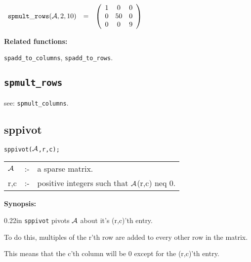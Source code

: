 \vspace*{0.1in}

\begin{flushleft}  
\hspace*{0.1in}
\begin{math}  
\begin{array}{ccc}
{\tt spmult\_rows}({\cal A},2,10) & = & 
        \left( \begin{array}{ccc} 1 & 0 & 0 \\ 0 & 50 & 0 \\ 0 & 0 & 
9 \end{array} \right) 
\end{array}
\end{math}  
\end{flushleft}

{\bf Related functions:}

\hspace*{0.175in} {\tt spadd\_to\_columns}, {\tt spadd\_to\_rows}.


\subsection{\tt spmult\_rows}

\hspace*{0.175in} see: {\tt spmult\_columns}.


\subsection{sppivot}

\hspace*{0.175in} {\tt sppivot(${\cal A}$,r,c);}

\hspace*{0.1in}  
\begin{tabular}{l l l} 
${\cal A}$ &:-& a sparse matrix. \\
r,c        &:-& positive integers such that ${\cal A}$(r,c) neq 0.
\end{tabular}

{\bf Synopsis:} %

\begin{addtolength}{\leftskip}{0.22in}
{\tt sppivot} pivots ${\cal A}$ about it's (r,c)'th entry. 
 
To do this, multiples of the r'th row are added to every
     other row in the matrix. 

This means that the c'th column
                will be 0 except for the (r,c)'th entry. 

\end{addtolength}


